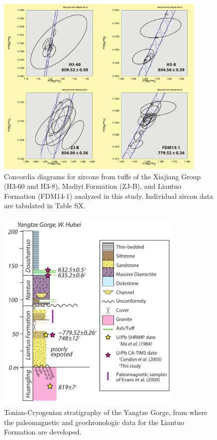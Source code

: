 \begin{figure}[h!]
    \centering
    \includegraphics[width=0.9\textwidth]{figures/Xiajiang/concordia-2.pdf}
    \caption[Concordia diagrams for zircons from tuffs of the Xiajiang Group, Madiyi Formation, and Liantuo Formation.]{Concordia diagrams for zircons from tuffs of the Xiajiang Group (H3-60 and H3-8), Madiyi Formation (ZJ-B), and Liantuo Formation (FDM14-1) analyzed in this study. Individual zircon data are tabulated in Table SX.}
    \label{fig:concordia-2}
\end{figure}

\begin{figure}[h!]
    \centering
    \includegraphics[width=0.8\textwidth]{figures/Xiajiang/FDM14-1-strat.pdf}
    \caption[Tonian-Cryogenian stratigraphy of the Yangtze Gorge.]{Tonian-Cryogenian stratigraphy of the Yangtze Gorge, from where the paleomagnetic and geochronologic data for the Liantuo Formation are developed.}
    \label{fig:FDM14-1-strat}
\end{figure}

